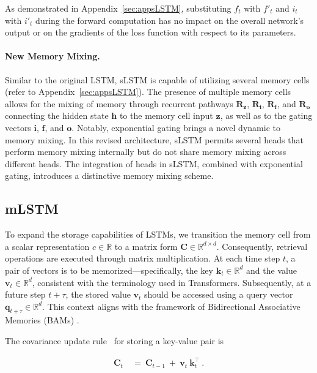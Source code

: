 As demonstrated in Appendix~\ref{sec:appsLSTM}, substituting $f_t$ with $f'_t$ and $i_t$ with $i'_t$ during the forward computation has no impact on the overall network’s output or on the gradients of the loss function with respect to its parameters.

\paragraph{New Memory Mixing.} Similar to the original LSTM, sLSTM is capable of utilizing several memory cells (refer to Appendix~\ref{sec:appsLSTM}). The presence of multiple memory cells allows for the mixing of memory through recurrent pathways $\mathbf{R}_{\mathbf{z}}$, $\mathbf{R}_{\mathbf{i}}$, $\mathbf{R}_{\mathbf{f}}$, and $\mathbf{R}_{\mathbf{o}}$ connecting the hidden state $\mathbf{h}$ to the memory cell input $\mathbf{z}$, as well as to the gating vectors $\mathbf{i}$, $\mathbf{f}$, and $\mathbf{o}$. Notably, exponential gating brings a novel dynamic to memory mixing. In this revised architecture, sLSTM permits several heads that perform memory mixing internally but do not share memory mixing across different heads. The integration of heads in sLSTM, combined with exponential gating, introduces a distinctive memory mixing scheme.

\subsection{mLSTM}
\label{sec:mLSTM}

To expand the storage capabilities of LSTMs, we transition the memory cell from a scalar representation $c \in \mathbb{R}$ to a matrix form $\mathbf{C} \in \mathbb{R}^{d \times d}$. Consequently, retrieval operations are executed through matrix multiplication. At each time step $t$, a pair of vectors is to be memorized—specifically, the key $\mathbf{k}_t \in \mathbb{R}^d$ and the value $\mathbf{v}_t \in \mathbb{R}^d$, consistent with the terminology used in Transformers. Subsequently, at a future step $t+\tau$, the stored value $\mathbf{v}_t$ should be accessed using a query vector $\mathbf{q}_{t+\tau} \in \mathbb{R}^d$. This context aligns with the framework of Bidirectional Associative Memories (BAMs) \citep{Kohonen:72,Anderson:72,Nakano:72,Anderson:77}.

The covariance update rule~\citep{Sejnowski:77,Dayan:91} for storing a key-value pair is

\begin{align}
\mathbf{C}_t \ &= \ \mathbf{C}_{t-1} \ + \ \mathbf{v}_{t} \ \mathbf{k}_t^\top \ .
\end{align}

